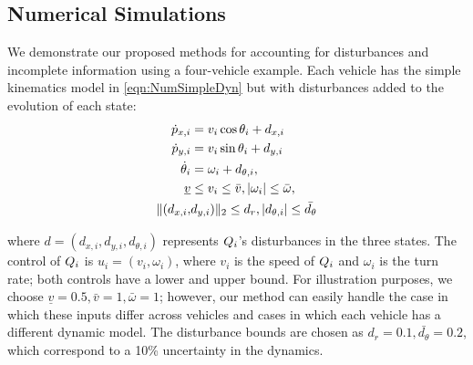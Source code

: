\subsection{Numerical Simulations \label{sec:sim_dstb}}
We demonstrate our proposed methods for accounting for disturbances and incomplete information using a four-vehicle example. Each vehicle has the simple kinematics model in \eqref{eqn:NumSimpleDyn} but with disturbances added to the evolution of each state:
\begin{equation}
\label{eq:dyn_i}
\begin{aligned}
\dot{\pos}_{x,i} &= v_i \cos \theta_i + d_{x,i} \\
\dot{\pos}_{y,i} &= v_i \sin \theta_i + d_{y,i}\\
\dot{\theta}_i &= \omega_i + d_{\theta,i}, \\
\underline{v} & \le v_i \le \bar{v}, |\omega_i| \le \bar{\omega},\\
\|(d_{x,i}, & d_{y,i}) \|_2 \le d_{r}, |d_{\theta,i}| \le \bar{d_{\theta}}
\end{aligned}
\end{equation}

\noindent where $d = (d_{x,i}, d_{y,i}, d_{\theta,i})$ represents $Q_i$'s disturbances in the three states. The control of $Q_i$ is $u_i = (v_i, \omega_i)$, where $v_i$ is the speed of $Q_i$ and $\omega_i$ is the turn rate; both controls have a lower and upper bound. For illustration purposes, we choose $\underline{v} = 0.5, \bar{v} = 1, \bar\omega = 1$; however, our method can easily handle the case in which these inputs differ across vehicles and cases in which each vehicle has a different dynamic model. The disturbance bounds are chosen as $d_{r} = 0.1, \bar{d_{\theta}} = 0.2$, which correspond to a 10\% uncertainty in the dynamics. %

%

